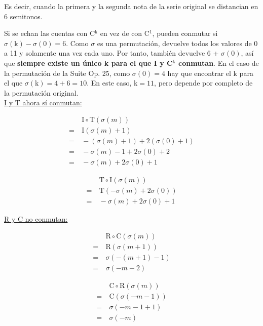 		Es decir, cuando la primera y la segunda nota de la serie original se distancian en 6 semitonos.
		
		Si se echan las cuentas con C$^\text{k}$ en vez de con C$^1$, pueden conmutar si $\sigma\left(\text{k}\right)-\sigma\left(0\right)=6$. Como $\sigma$ es una permutación, devuelve todos los valores de 0 a 11 y solamente una vez cada uno. Por tanto, también devuelve 6 + $\sigma(0)$, así que \textbf{siempre existe un único k para el que I y C$^\text{k}$ conmutan}. En el caso de la permutación de la Suite Op. 25, como $\sigma\left(0\right)=4$ hay que encontrar el k para el que $\sigma\left(\text{k}\right)=4+6=10$. En este caso, $\text{k}=11$, pero depende por completo de la permutación original.\\
		
		 \underline{I y T ahora sí conmutan:}
		 \vspace*{-2\bigskipamount}
		\begin{multicols}{2}
			\begin{align*}
			&\ \text{I}\circ\text{T}(\sigma(m))\\
			=&\ \text{I}(\sigma(m)+1)\\
			=&\ -(\sigma(m)+1) + 2(\sigma(0)+1)\\
			=&\ -\sigma(m)-1+2\sigma(0)+2\\
			=&\ -\sigma(m)+2\sigma(0)+1
			\end{align*}
			
			\begin{align*}
			&\ \text{T}\circ\text{I}(\sigma(m))\\
			=&\ \text{T}(-\sigma(m)+2\sigma(0))\\
			=&\ -\sigma(m)+2\sigma(0)+1
			\end{align*}
		\end{multicols}
		
		 \underline{R y C no conmutan:}
		 \vspace*{-2\bigskipamount}
		\begin{multicols}{2}
		\begin{align*}
		&\ \text{R}\circ\text{C}(\sigma(m))\\
		=&\ \text{R}(\sigma(m+1))\\
		=&\ \sigma(-(m+1)-1)\\
		=&\ \sigma(-m-2)
		\end{align*}
		
		\begin{align*}
		&\ \text{C}\circ\text{R}(\sigma(m))\\
		=&\ \text{C}(\sigma(-m-1))\\
		=&\ \sigma(-m-1+1)\\
		=&\ \sigma(-m)
		\end{align*}
		\end{multicols}
		
